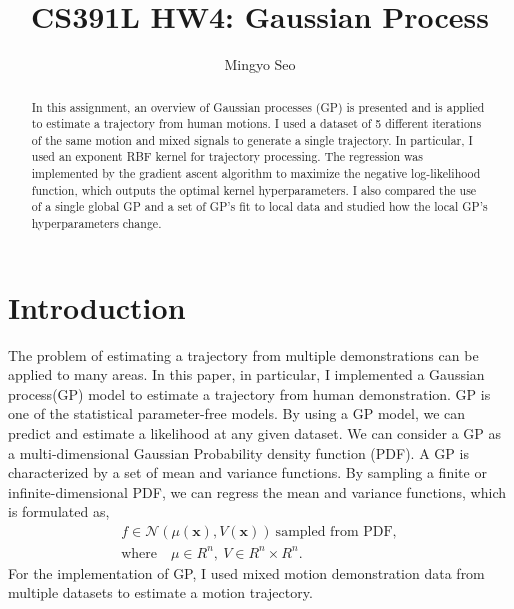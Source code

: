\documentclass[conference]{IEEEtran}
\begin{document}
\title{CS391L HW4: Gaussian Process}

\author{Mingyo Seo}

\author{
}



\maketitle

\IEEEpeerreviewmaketitle

\begin{abstract}
In this assignment, an overview of Gaussian processes (GP) is presented and is applied to estimate a trajectory from human motions.
I used a dataset of 5 different iterations of the same motion and mixed signals to generate a single trajectory.
In particular, I used an exponent RBF kernel for trajectory processing.
The regression was implemented by the gradient ascent algorithm to maximize the negative log-likelihood function, which outputs the optimal kernel hyperparameters.
I also compared the use of a single global GP and a set of GP's fit to local data and studied how the local GP's hyperparameters change.
\end{abstract}

\section{Introduction} %

The problem of estimating a trajectory from multiple demonstrations can be applied to many areas.
In this paper, in particular, I implemented a Gaussian process(GP) model to estimate a trajectory from human demonstration. 
GP is one of the statistical parameter-free models.
By using a GP model, we can predict and estimate a likelihood at any given dataset.
We can consider a GP as a multi-dimensional Gaussian Probability density function (PDF).
A GP is characterized by a set of mean and variance functions.
By sampling a finite or infinite-dimensional PDF, we can regress the mean and variance functions, which is formulated as,
\begin{equation}
\begin{aligned}
    f \in \mathcal{N}(\mu(\boldsymbol{x}),V(\boldsymbol{x}))\ \text{sampled from PDF},\\
    \text{where} \quad \mu \in R^n,\ V\in R^n\times R^n.
\end{aligned}
\end{equation}
For the implementation of GP, I used mixed motion demonstration data from multiple datasets to estimate a motion trajectory.
\end{document}
